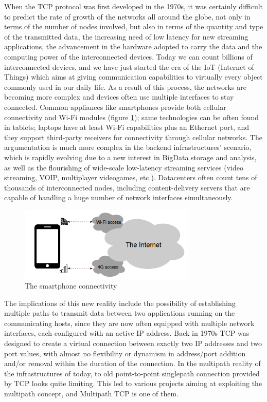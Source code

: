 \vspace{5mm}
When the TCP protocol was first developed in the 1970s, it was certainly difficult to predict the rate of growth of the networks all around the globe, not only in terms of the number of nodes involved, but also in terms of the quantity and type of the transmitted data, the increasing need of low latency for new streaming applications, the advancement in the hardware adopted to carry the data and the computing power of the interconnected devices. Today we can count billions of interconnected devices, and we have just started the era of the IoT (Internet of Things) which aims at giving communication capabilities to virtually every object commonly used in our daily life.
As a result of this process, the networks are becoming more complex and devices often use multiple interfaces to stay connected. Common appliances like smartphones provide both cellular connectivity and Wi-Fi modules (figure \ref{fig:smartphones}); same technologies can be often found in tablets; laptops have at least Wi-Fi capabilities plus an Ethernet port, and they support third-party receivers for connectivity through cellular networks. The argumentation is much more complex in the backend infrastructures' scenario, which is rapidly evolving due to a new interest in BigData storage and analysis, as well as the flourishing of wide-scale low-latency streaming services (video streaming, VOIP, multiplayer videogames, etc.). Datacenters often count tens of thousands of interconnected nodes, including content-delivery servers that are capable of handling a huge number of network interfaces simultaneously.

\begin{figure}[!htb]
\centering
\includegraphics[width=0.75\textwidth]{images/smartphones}
\caption{The smartphone connectivity}
\label{fig:smartphones}
\end{figure}

The implications of this new reality include the possibility of establishing multiple paths to transmit data between two applications running on the communicating hosts, since they are now often equipped with multiple network interfaces, each configured with an active IP address. Back in 1970s TCP was designed to create a virtual connection between exactly two IP addresses and two port values, with almost no flexibility or dynamism in address/port addition and/or removal within the duration of the connection. In the multipath reality of the infrastructures of today, to old point-to-point singlepath connection provided by TCP looks quite limiting. This led to various projects aiming at exploiting the multipath concept, and Multipath TCP is one of them.


